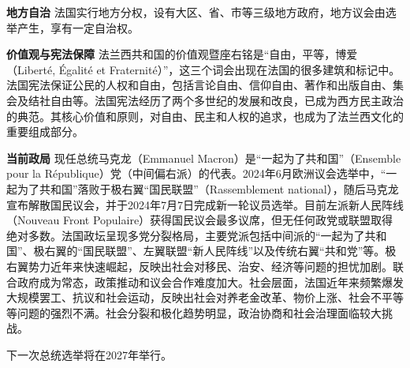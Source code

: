 \textbf{地方自治} 法国实行地方分权，设有大区、省、市等三级地方政府，地方议会由选举产生，享有一定自治权。

\textbf{价值观与宪法保障} 法兰西共和国的价值观暨座右铭是“自由，平等，博爱（Liberté, Égalité et Fraternité）”，这三个词会出现在法国的很多建筑和标记中。法国宪法保证公民的人权和自由，包括言论自由、信仰自由、著作和出版自由、集会及结社自由等。法国宪法经历了两个多世纪的发展和改良，已成为西方民主政治的典范。其核心价值和原则，对自由、民主和人权的追求，也成为了法兰西文化的重要组成部分。

\textbf{当前政局} 现任总统马克龙（Emmanuel Macron）是“一起为了共和国”（Ensemble pour la République）党（中间偏右派）的代表。2024年6月欧洲议会选举中，“一起为了共和国”落败于极右翼“国民联盟”（Rassemblement national），随后马克龙宣布解散国民议会，并于2024年7月7日完成新一轮议员选举。目前左派新人民阵线（Nouveau Front Populaire）获得国民议会最多议席，但无任何政党或联盟取得绝对多数。法国政坛呈现多党分裂格局，主要党派包括中间派的“一起为了共和国”、极右翼的“国民联盟”、左翼联盟“新人民阵线”以及传统右翼“共和党”等。极右翼势力近年来快速崛起，反映出社会对移民、治安、经济等问题的担忧加剧。联合政府成为常态，政策推动和议会合作难度加大。社会层面，法国近年来频繁爆发大规模罢工、抗议和社会运动，反映出社会对养老金改革、物价上涨、社会不平等等问题的强烈不满。社会分裂和极化趋势明显，政治协商和社会治理面临较大挑战。

下一次总统选举将在2027年举行。
